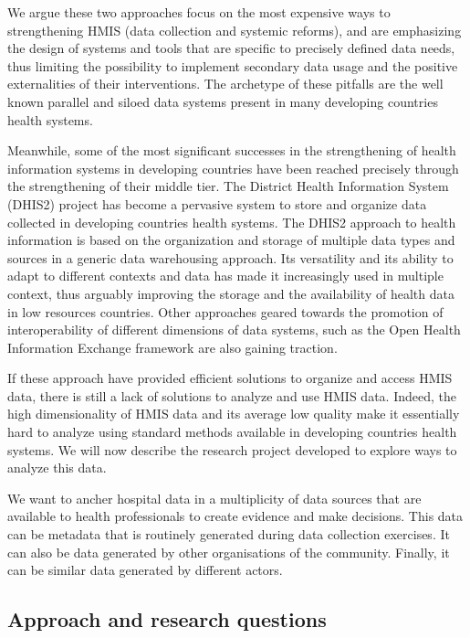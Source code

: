 We argue these two approaches focus on the most expensive ways to strengthening HMIS (data collection and systemic reforms), and are emphasizing the design of systems and tools that are specific to precisely defined data needs, thus limiting the possibility to implement secondary data usage and the positive externalities of their interventions. The archetype of these pitfalls are the well known parallel and siloed data systems present in many developing countries health systems.

Meanwhile, some of the most significant successes in the strengthening of health information systems in developing countries have been reached precisely through the strengthening of their middle tier. The District Health Information System (DHIS2) project has become a pervasive system to store and organize data collected in developing countries health systems. The DHIS2 approach to health information is based on the organization and storage of multiple data types and sources in a generic data warehousing approach. Its versatility and its ability to adapt to different contexts and data has made it increasingly used in multiple context, thus arguably improving the storage and the availability of health data in low resources countries. Other approaches geared towards the promotion of interoperability of different dimensions of data systems, such as the Open Health Information Exchange framework are also gaining traction.


If these approach have provided efficient solutions to organize and access HMIS data, there is still a lack of solutions to analyze and use HMIS data. Indeed, the high dimensionality of HMIS data and its average low quality make it essentially hard to analyze using standard methods available in developing countries health systems. We will now describe the research project developed to explore ways to analyze this data.

We want to ancher hospital data in a multiplicity of data sources that are available to health professionals to create evidence and make decisions. This data can be metadata that is routinely generated during data collection exercises. It can also be data generated by other organisations of the community. Finally, it can be similar data generated by different actors.

\subsection{Approach and research questions}

